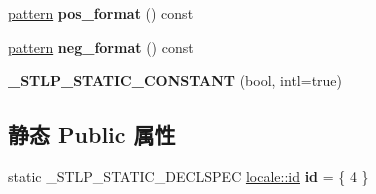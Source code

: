 \begin{DoxyCompactItemize}
\item 
\mbox{\label{classmoneypunct_3_01char_00_01true_01_4_a256ec4ada17dc92fd92a2e1d058b584e}} 
\hyperlink{structmoney__base_1_1pattern}{pattern} {\bfseries pos\+\_\+format} () const
\item 
\mbox{\label{classmoneypunct_3_01char_00_01true_01_4_a38a4a48c9698a6c21b7f145922a126e3}} 
\hyperlink{structmoney__base_1_1pattern}{pattern} {\bfseries neg\+\_\+format} () const
\item 
\mbox{\label{classmoneypunct_3_01char_00_01true_01_4_a30f1e226594165d375dad89927b5c962}} 
{\bfseries \+\_\+\+S\+T\+L\+P\+\_\+\+S\+T\+A\+T\+I\+C\+\_\+\+C\+O\+N\+S\+T\+A\+NT} (bool, intl=true)
\end{DoxyCompactItemize}
\subsection*{静态 Public 属性}
\begin{DoxyCompactItemize}
\item 
\mbox{\label{classmoneypunct_3_01char_00_01true_01_4_af96da9294fb95e21fdf9bb4bc556d4dd}} 
static \+\_\+\+S\+T\+L\+P\+\_\+\+S\+T\+A\+T\+I\+C\+\_\+\+D\+E\+C\+L\+S\+P\+EC \hyperlink{classlocale_1_1id}{locale\+::id} {\bfseries id} = \{ 4 \}
\end{DoxyCompactItemize}
